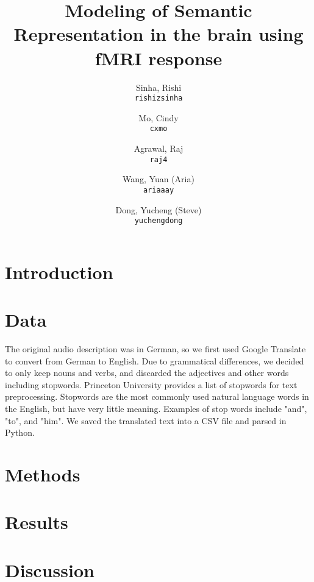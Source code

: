 \documentclass[11pt]{article}
\title{Modeling of Semantic Representation in the brain using fMRI response}
\author{
  Sinha, Rishi\\
  \texttt{rishizsinha}
  \and
  Mo, Cindy\\
  \texttt{cxmo}
  \and
  Agrawal, Raj\\
  \texttt{raj4}
  \and
  Wang, Yuan (Aria)\\
  \texttt{ariaaay}
  \and
  Dong, Yucheng (Steve)\\
  \texttt{yuchengdong}
}
\begin{document}
\maketitle



\section{Introduction}

\section{Data}
 The original audio description was in German, so we first used Google Translate 
 to convert from German to English. Due to grammatical differences, we decided to
 only keep nouns and verbs, and discarded the adjectives and other words including
 stopwords. Princeton University provides a list of stopwords for text preprocessing.
 Stopwords are the most commonly used natural language words in the English, but have 
 very little meaning. Examples of stop words include "and", "to", and "him". We saved 
 the translated text into a CSV file and parsed in Python. 

\section{Methods}
\section{Results}
\section{Discussion}



\end{document}
